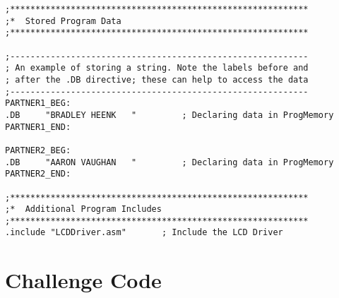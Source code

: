 \documentclass[12pt, letterpaper]{article}
\begin{document}
\begin{verbatim}
;***********************************************************
;*	Stored Program Data
;***********************************************************

;-----------------------------------------------------------
; An example of storing a string. Note the labels before and
; after the .DB directive; these can help to access the data
;-----------------------------------------------------------
PARTNER1_BEG:
.DB		"BRADLEY HEENK   "         ; Declaring data in ProgMemory
PARTNER1_END:

PARTNER2_BEG:
.DB		"AARON VAUGHAN   "         ; Declaring data in ProgMemory
PARTNER2_END:

;***********************************************************
;*	Additional Program Includes
;***********************************************************
.include "LCDDriver.asm"       ; Include the LCD Driver

\end{verbatim}























\section{Challenge Code}
\end{document}
